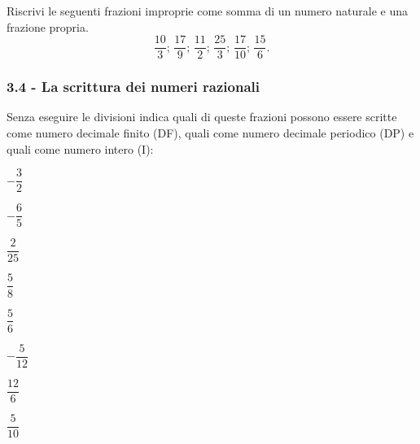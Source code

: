 \begin{esercizio}
 \label{ese:3.22}
 Riscrivi le seguenti frazioni improprie come somma di un numero naturale e una frazione propria.
\[\frac{10}{3};\,\frac{17}{9};\,\frac{11}{2};\,\frac{25}{3};\,\frac{17}{10};\,\frac{15}{6}.\]
\end{esercizio}

\subsubsection*{3.4 - La scrittura dei numeri razionali}

\begin{esercizio}
 \label{ese:3.23}
 Senza eseguire le divisioni indica quali di queste frazioni possono essere scritte come numero decimale
finito (DF), quali come numero decimale periodico (DP)
e quali come numero intero (I):
 \begin{multicols}{2}
 \TabPositions{1cm}
 \begin{enumeratea}
 \item $-\dfrac{3}{2}$ \tab\qquad\boxDF\qquad\boxDP\quad\:\:\boxI\vspace{1.1ex}
 \item $-\dfrac{6}{5}$ \tab\qquad\boxDF\qquad\boxDP\quad\:\:\boxI\vspace{1.1ex}
 \item $\dfrac{2}{25}$ \tab\qquad\boxDF\qquad\boxDP\quad\:\:\boxI\vspace{1.1ex}
 \item $\dfrac{5}{8}$ \tab\qquad\boxDF\qquad\boxDP\quad\:\:\boxI
 \item $\dfrac{5}{6}$ \tab\qquad\boxDF\qquad\boxDP\quad\:\:\boxI\vspace{1.1ex}
 \item $-\dfrac{5}{12}$ \tab\qquad\boxDF\qquad\boxDP\quad\:\:\boxI\vspace{1.1ex}
 \item $\dfrac{12}{6}$ \tab\qquad\boxDF\qquad\boxDP\quad\:\:\boxI\vspace{1.1ex}
 \item $\dfrac{5}{10}$ \tab\qquad\boxDF\qquad\boxDP\quad\:\:\boxI
 \end{enumeratea}
 \end{multicols}
\end{esercizio}

